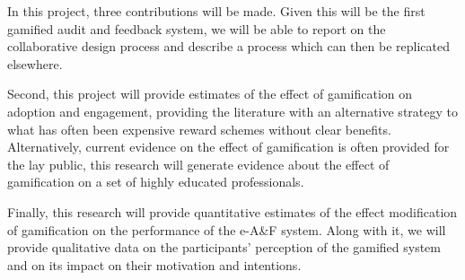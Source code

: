 In this project, three contributions will be made. Given this will be the first gamified audit and feedback system, we will be able to report on the collaborative design process and describe a process which can then be replicated elsewhere.

Second, this project will provide estimates of the effect of gamification on adoption and engagement, providing the literature with an alternative strategy to what has often been expensive reward schemes without clear benefits. Alternatively, current evidence on the effect of gamification is often provided for the lay public, this research will generate evidence about the effect of gamification on a set of highly educated professionals.

Finally, this research will provide quantitative estimates of the effect modification of gamification on the performance of the e-A\&F system. Along with it, we will provide qualitative data on the participants’ perception of the gamified system and on its impact on their motivation and intentions.